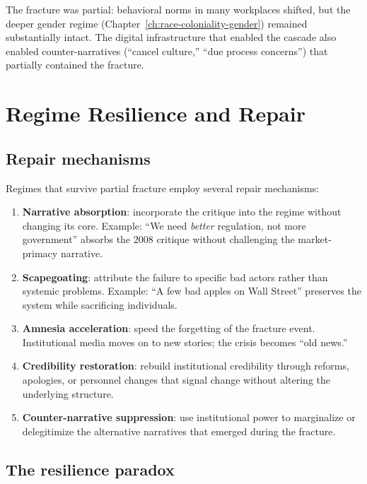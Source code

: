 The fracture was partial: behavioral norms in many workplaces shifted, but the deeper gender regime (Chapter~\ref{ch:race-coloniality-gender}) remained substantially intact.
The digital infrastructure that enabled the cascade also enabled counter-narratives (``cancel culture,'' ``due process concerns'') that partially contained the fracture.

\section{Regime Resilience and Repair}
\label{sec:ch30-resilience}

\subsection{Repair mechanisms}

Regimes that survive partial fracture employ several repair mechanisms:

\begin{enumerate}[nosep]
  \item \textbf{Narrative absorption}: incorporate the critique into the regime without changing its core. Example: ``We need \emph{better} regulation, not more government'' absorbs the 2008 critique without challenging the market-primacy narrative.

  \item \textbf{Scapegoating}: attribute the failure to specific bad actors rather than systemic problems. Example: ``A few bad apples on Wall Street'' preserves the system while sacrificing individuals.

  \item \textbf{Amnesia acceleration}: speed the forgetting of the fracture event. Institutional media moves on to new stories; the crisis becomes ``old news.''

  \item \textbf{Credibility restoration}: rebuild institutional credibility through reforms, apologies, or personnel changes that signal change without altering the underlying structure.

  \item \textbf{Counter-narrative suppression}: use institutional power to marginalize or delegitimize the alternative narratives that emerged during the fracture.
\end{enumerate}

\subsection{The resilience paradox}

